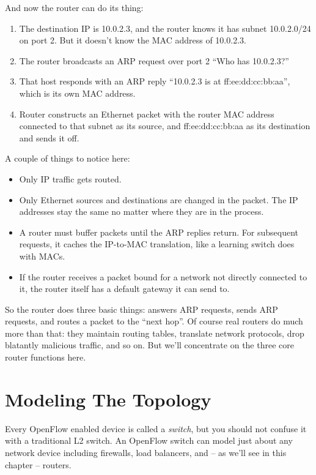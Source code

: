 And now the router can do its thing:

\begin{enumerate}
\item The destination IP is 10.0.2.3, and the router knows it has subnet 10.0.2.0/24
on port 2.  But it doesn't know the MAC address of 10.0.2.3.
\item The router broadcasts an ARP request over port 2 ``Who has 10.0.2.3?''
\item That host responds with an ARP reply ``10.0.2.3 is at ff:ee:dd:cc:bb:aa'', which is its 
own MAC address.
\item Router constructs an Ethernet packet with the router MAC address connected to that
subnet as its source,
and ff:ee:dd:cc:bb:aa as its destination and sends it off.
\end{enumerate}

A couple of things to notice here:

\begin{itemize}
\item Only IP traffic gets routed.  
\item Only Ethernet sources and destinations are changed in the packet.  The IP addresses
stay the same no matter where they are in the process.
\item A router must buffer packets until the ARP replies return.  For subsequent requests, it caches the
IP-to-MAC translation, like a learning switch does with MACs.
\item If the router receives a packet bound for a network not directly connected to it, the router
itself has a default gateway it can send to.  
\end{itemize}

So the router does three basic things: answers ARP requests, sends ARP requests, and routes
a packet to the ``next hop''.  Of course real routers do much more than that: they maintain routing tables,
translate network protocols, drop blatantly malicious traffic, and so on.  But we'll concentrate 
on the three core router functions here.

\section{Modeling The Topology}
\label{routing:topo}

Every OpenFlow enabled device is called a \emph{switch}, but you should not confuse it
with a traditional L2 switch.  An OpenFlow switch can model just about any network device
including firewalls, load balancers, and -- as we'll see in this chapter -- routers.  

